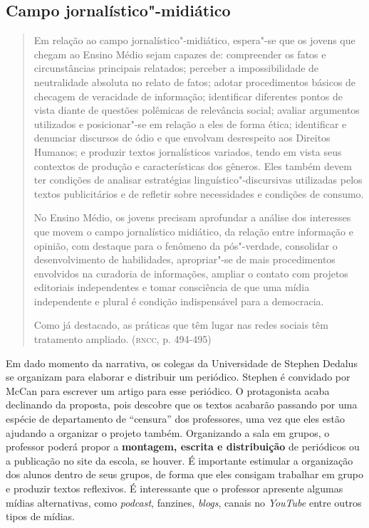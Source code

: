 \documentclass[12pt]{extarticle}
\begin{document}
{\subsection{Campo jornalístico"-midiático}

\begin{quote}
Em relação ao campo jornalístico"-midiático, espera"-se que os jovens
que chegam ao Ensino Médio sejam capazes de: compreender os fatos e
circunstâncias principais relatados; perceber a impossibilidade de
neutralidade absoluta no relato de fatos; adotar procedimentos básicos
de checagem de veracidade de informação; identificar diferentes pontos
de vista diante de questões polêmicas de relevância social; avaliar
argumentos utilizados e posicionar"-se em relação a eles de forma ética;
identificar e denunciar discursos de ódio e que envolvam desrespeito aos
Direitos Humanos; e produzir textos jornalísticos variados, tendo em
vista seus contextos de produção e características dos gêneros. Eles
também devem ter condições de analisar estratégias
linguístico"-discursivas utilizadas pelos textos publicitários e de
refletir sobre necessidades e condições de consumo.

No Ensino Médio, os jovens precisam aprofundar a análise dos interesses
que movem o campo jornalístico midiático, da relação entre informação e
opinião, com destaque para o fenômeno da pós"-verdade, consolidar o
desenvolvimento de habilidades, apropriar"-se de mais procedimentos
envolvidos na curadoria de informações, ampliar o contato com projetos
editoriais independentes e tomar consciência de que uma mídia
independente e plural é condição indispensável para a democracia.

Como já destacado, as práticas que têm lugar nas redes sociais têm
tratamento ampliado. (\textsc{bncc}, p. 494-495)
\end{quote}

Em dado momento da narrativa, os colegas da Universidade de Stephen
Dedalus se organizam para elaborar e distribuir um periódico. Stephen
é convidado por McCan para escrever um artigo para esse periódico. O
protagonista acaba declinando da proposta, pois descobre que os textos
acabarão passando por uma espécie de departamento de ``censura'' dos
professores, uma vez que eles estão ajudando a organizar o projeto
também. Organizando a sala em grupos, o professor poderá propor a
\textbf{montagem, escrita e distribuição} de periódicos ou a
publicação no site da escola, se houver. É importante estimular a
organização dos alunos dentro de seus grupos, de forma que eles
consigam trabalhar em grupo e produzir textos reflexivos. É
interessante que o professor apresente algumas mídias alternativas,
como \emph{podcast}, fanzines, \emph{blogs}, canais no \emph{YouTube}
entre outros tipos de mídias.

}
\end{document}
